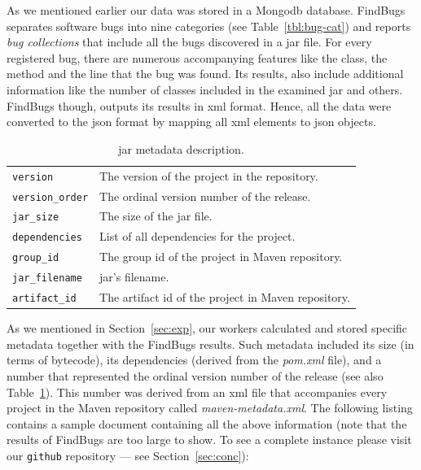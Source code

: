 \documentclass{sig-alternate}
\begin{document}
As we mentioned earlier our data was stored in a
Mongo{\sc db} database.
FindBugs separates software bugs into nine categories (see
Table~\ref{tbl:bug-cat}) and reports {\it bug collections}
that include all the bugs
discovered in a {\sc jar} file. For every registered bug, there are
numerous accompanying features like the class, the method
and the line that the bug was found. Its results, also include
additional information like the number of classes included in
the examined {\sc jar} and others.
FindBugs though,
outputs its results in  {\sc xml} format.
Hence, all the data were
converted to the {\sc json} format
by mapping all {\sc xml} elements to {\sc json} objects.

\begin{table}
\centering
\begin{tabular}{l p{5.0cm}}
 \hline
\verb|version| & The version of the project in the repository. \\
\verb|version_order| & The ordinal version number of the release. \\
\verb|jar_size| & The size of the {\sc jar} file. \\
\verb|dependencies| & List of all dependencies for the project. \\
\verb|group_id| & The group {\sc id} of the project in Maven repository. \\
\verb|jar_filename| & {\sc jar}'s filename. \\
\verb|artifact_id| & The artifact {\sc id} of the project in Maven repository. \\
 \hline
 \end{tabular}
\caption{{\sc jar} metadata description.}
\label{tbl:metadata-description}
\end{table}

As we mentioned in Section~\ref{sec:exp}, our
workers calculated and stored specific metadata together
with the FindBugs results.
Such metadata included its size (in terms of bytecode),
its dependencies
(derived from the {\it pom.xml} file),
and a number that represented the ordinal version
number of the release (see also
Table~\ref{tbl:metadata-description}).
This number was derived from an {\sc xml}
file that accompanies every project in the Maven repository
called {\it maven-metadata.xml}.
The following listing contains a sample document
containing all the above information (note
that the results of FindBugs are too large to
show. To see a complete instance please visit our
{\tt github} repository --- see Section~\ref{sec:conc}):
 
\end{document}
